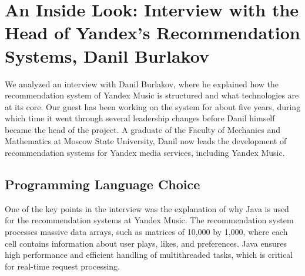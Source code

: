\documentclass[12pt,a4paper]{article}
\begin{document}
\begin{center}
\end{center}


\section{An Inside Look: Interview with the Head of Yandex's Recommendation Systems, Danil Burlakov}

    We analyzed an interview with Danil Burlakov, where he explained how the recommendation system of Yandex Music is structured and what technologies are at its core. Our guest has been working on the system for about five years, during which time it went through several leadership changes before Danil himself became the head of the project. A graduate of the Faculty of Mechanics and Mathematics at Moscow State University, Danil now leads the development of recommendation systems for Yandex media services, including Yandex Music\citep{YandexI}.

\subsection{Programming Language Choice}

One of the key points in the interview was the explanation of why Java is used for the recommendation systems at Yandex Music. The recommendation system processes massive data arrays, such as matrices of 10,000 by 1,000, where each cell contains information about user plays, likes, and preferences. Java ensures high performance and efficient handling of multithreaded tasks, which is critical for real-time request processing\citep{YT}.
\end{document}

